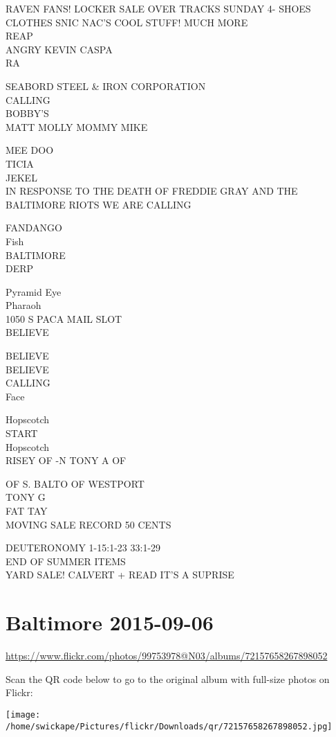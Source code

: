 \documentclass[10pt,letterpaper]{article}
\begin{document}
RAVEN FANS!  LOCKER SALE OVER TRACKS SUNDAY 4{-} SHOES CLOTHES SNIC NAC'S COOL STUFF!  MUCH MORE\\
REAP\\
ANGRY KEVIN CASPA\\
RA

SEABORD STEEL \& IRON CORPORATION\\
CALLING\\
BOBBY'S\\
MATT MOLLY MOMMY MIKE

MEE DOO\\
TICIA\\
JEKEL\\
IN RESPONSE TO THE DEATH OF FREDDIE GRAY AND THE BALTIMORE RIOTS WE ARE CALLING

FANDANGO\\
Fish\\
BALTIMORE\\
DERP

Pyramid Eye\\
Pharaoh\\
1050 S PACA MAIL SLOT\\
BELIEVE

BELIEVE\\
BELIEVE\\
CALLING\\
Face

Hopscotch\\
START\\
Hopscotch\\
RISEY OF {-}N TONY A OF

OF S. BALTO OF WESTPORT\\
TONY G\\
FAT TAY\\
MOVING SALE RECORD 50 CENTS

DEUTERONOMY 1{-}15:1{-}23 33:1{-}29\\
END OF SUMMER ITEMS\\
YARD SALE! CALVERT + READ IT'S A SUPRISE


\section*{Baltimore 2015-09-06}

\url{https://www.flickr.com/photos/99753978@N03/albums/72157658267898052}

Scan the QR code below to go to the original album with full-size photos on Flickr:

\texttt{[image: /home/swickape/Pictures/flickr/Downloads/qr/72157658267898052.jpg]}
\end{document}
